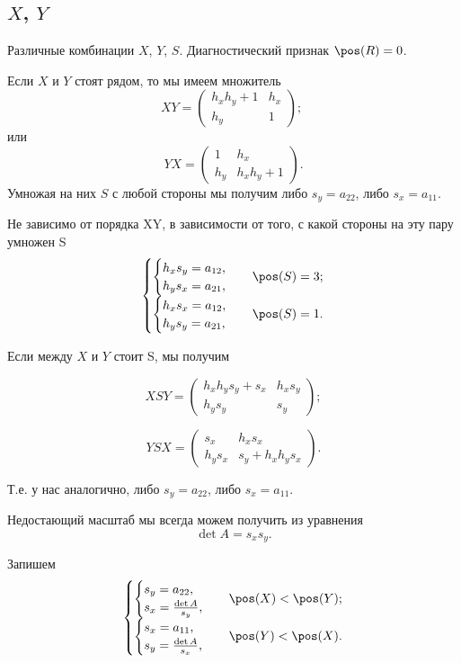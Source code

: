 \subsection{$X$, $Y$}

Различные комбинации $X$, $Y$, $S$.
Диагностический признак $\pos(R)=0$.

Если $X$ и $Y$ стоят рядом, то мы имеем множитель
$$XY = \begin{pmatrix}
	h_xh_y+1 & h_x \\
	h_y & 1
\end{pmatrix};\;
$$
или
$$
YX = \begin{pmatrix}
	1 & h_x \\
	h_y & h_xh_y+1
\end{pmatrix}.$$
Умножая на них $S$ с любой стороны мы получим либо $s_y = a_{22}$, либо $s_x = a_{11}$.

Не зависимо от порядка XY, в зависимости от того, с какой стороны на эту пару умножен S
$$\begin{cases}
	\begin{cases}
		h_xs_y = a_{12},\\
		h_ys_x = a_{21},
	\end{cases}
	& \pos(S)=3;\\
	\begin{cases}
		h_xs_x = a_{12},\\
		h_ys_y = a_{21},
	\end{cases}
	& \pos(S)=1.
\end{cases}
$$


Если между $X$ и $Y$ стоит S, мы получим

$$XSY =
\begin{pmatrix}
	h_x h_y s_y + s_x & h_x s_y \\
	h_y s_y  & s_y
\end{pmatrix};
$$

$$YSX =
\begin{pmatrix}
s_x & h_x s_x\\
h_y s_x & s_y + h_x h_y s_x
\end{pmatrix}.
$$

Т.е. у нас аналогично, либо $s_y = a_{22}$, либо $s_x = a_{11}$.

Недостающий масштаб мы всегда можем получить из уравнения
$$\det A = s_x s_y.$$

Запишем
$$\begin{cases}
	\begin{cases}
		s_y = a_{22},\\
		s_x = \frac{\det{A}}{s_y},\\
	\end{cases} & \pos(X)<\pos(Y);\\
	\begin{cases}
		s_x = a_{11},\\
		s_y = \frac{\det{A}}{s_x},\\
	\end{cases} & \pos(Y)<\pos(X).
\end{cases}$$


